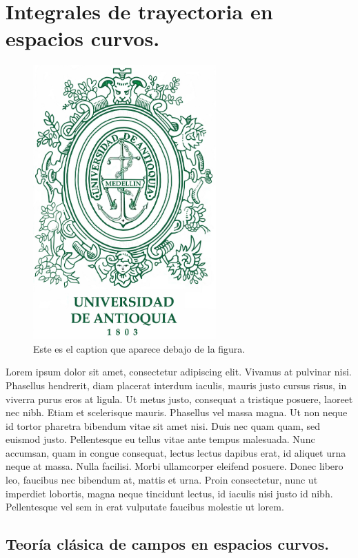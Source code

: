 \chapter{Integrales de trayectoria en espacios curvos.}
\begin{figure}[h]
\centering
\includegraphics[width=7cm]{Imagenes/Escudoudea}
\caption[Esto es lo que aparece en la tabla de figuras]{Este es el caption que aparece debajo de la figura.}
\end{figure}


Lorem ipsum dolor sit amet, consectetur adipiscing elit. Vivamus at pulvinar nisi. Phasellus hendrerit, diam placerat interdum iaculis, mauris justo cursus risus, in viverra purus eros at ligula. Ut metus justo, consequat a tristique posuere, laoreet nec nibh. Etiam et scelerisque mauris. Phasellus vel massa magna. Ut non neque id tortor pharetra bibendum vitae sit amet nisi. Duis nec quam quam, sed euismod justo. Pellentesque eu tellus vitae ante tempus malesuada. Nunc accumsan, quam in congue consequat, lectus lectus dapibus erat, id aliquet urna neque at massa. Nulla facilisi. Morbi ullamcorper eleifend posuere. Donec libero leo, faucibus nec bibendum at, mattis et urna. Proin consectetur, nunc ut imperdiet lobortis, magna neque tincidunt lectus, id iaculis nisi justo id nibh. Pellentesque vel sem in erat vulputate faucibus molestie ut lorem.

\section{Teoría clásica de campos en espacios curvos.}

